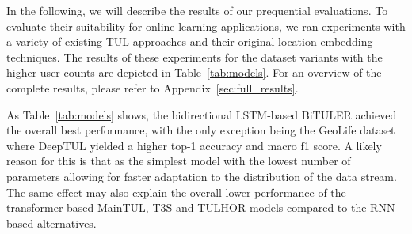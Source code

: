 \documentclass{article} %
\theoremstyle{definition}
\begin{document}

In the following, we will describe the results of our prequential evaluations.
To evaluate their suitability for online learning applications, we ran experiments with a variety of existing TUL approaches and their original location embedding techniques.
The results of these experiments for the dataset variants with the higher user counts are depicted in Table~\ref{tab:models}.
For an overview of the complete results, please refer to Appendix~\ref{sec:full_results}.

As Table~\ref{tab:models} shows, the bidirectional LSTM-based BiTULER achieved the overall best performance, with the only exception being the GeoLife dataset where DeepTUL yielded a higher top-1 accuracy and macro f1 score.
A likely reason for this is that as the simplest model with the lowest number of parameters allowing for faster adaptation to the distribution of the data stream.
The same effect may also explain the overall lower performance of the transformer-based MainTUL, T3S and TULHOR models compared to the RNN-based alternatives.
\end{document}
